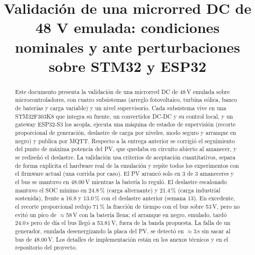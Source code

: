 \documentclass[conference]{IEEEtran}
\begin{document}
\title{Validación de una microrred DC de 48 V emulada: condiciones nominales y ante perturbaciones sobre STM32 y ESP32\\
}

\author{
\and
{}
}

\maketitle

\begin{abstract}
Este documento presenta la validación de una microrred DC de 48\,V emulada sobre microcontroladores, con cuatro subsistemas (arreglo fotovoltaico, turbina eólica, banco de baterías y carga variable) y un nivel supervisorio. Cada subsistema vive en una STM32F303K8 que integra su fuente, un convertidor DC-DC y su control local, y un gateway ESP32-S3 los acopla, ejecuta una máquina de estados de supervisión (recorte proporcional de generación, deslastre de carga por niveles, modo seguro y arranque en negro) y publica por MQTT. Respecto a la entrega anterior se corrigió el seguimiento del punto de máxima potencia del PV, que quedaba en circuito abierto al amanecer, y se rediseñó el deslastre. La validación usa criterios de aceptación cuantitativos, separa de forma explícita el hardware real de la emulación y repite todos los experimentos con el firmware actual (una corrida por caso). El PV arrancó solo en 3 de 3 amaneceres y el bus se mantuvo en 48.00\,V mientras la batería lo reguló. El deslastre escalonado mantuvo el SOC mínimo en 24.8\,\% (carga alternante) y 21.4\,\% (carga industrial sostenida), frente a 16.8 y 13.0\,\% con el deslastre anterior (semana 13). En excedente, el recorte proporcional redujo 71\,\% la fracción de tiempo con el bus sobre 53\,V, pero no evitó un pico de $\approx$58\,V con la batería llena; el arranque en negro, emulado, tardó 24.0\,s pero de día el bus llegó a 53.81\,V, fuera de la banda propuesta. La falla de un generador, emulada desenergizando la placa del PV, se detectó en $\approx$3\,s sin sacar al bus de 48.00\,V. Los detalles de implementación están en los anexos técnicos y en el repositorio del proyecto.
\end{abstract}
\end{document}
